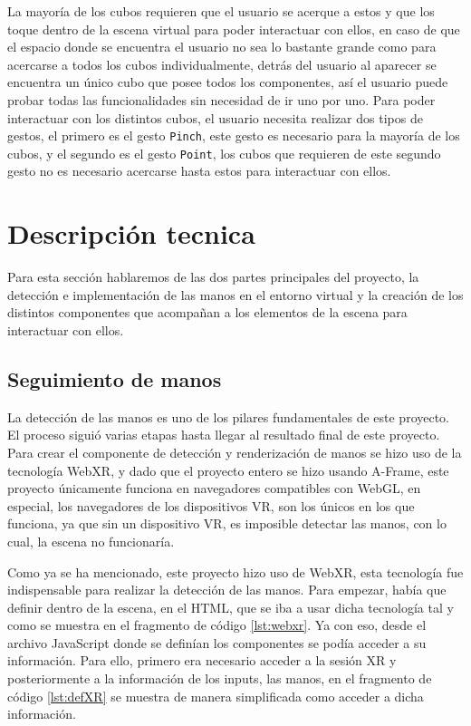 \documentclass[a4paper, 12pt]{book}
\begin{document}
La mayoría de los cubos requieren que el usuario se acerque a estos y que los toque dentro de la escena virtual para poder interactuar con ellos, en caso de que el espacio donde se encuentra el usuario no sea lo bastante grande como para acercarse a todos los cubos individualmente, detrás del usuario al aparecer se encuentra un único cubo que posee todos los componentes, así el usuario puede probar todas las funcionalidades sin necesidad de ir uno por uno. 
Para poder interactuar con los distintos cubos, el usuario necesita realizar dos tipos de gestos, el primero es el gesto \texttt{Pinch}, este gesto es necesario para la mayoría de los cubos, y el segundo es el gesto \texttt{Point}, los cubos que requieren de este segundo gesto no es necesario acercarse hasta estos para interactuar con ellos. 

\section{Descripción tecnica}
\label{sec:descripcion-tecnica}

Para esta sección hablaremos de las dos partes principales del proyecto, la detección e implementación de las manos en el entorno virtual y la creación de los distintos componentes que acompañan a los elementos de la escena para interactuar con ellos.

\subsection{Seguimiento de manos}
\label{subsec:handtracking}
La detección de las manos es uno de los pilares fundamentales de este proyecto. El proceso siguió varias etapas hasta llegar al resultado final de este proyecto. Para crear el componente de detección y renderización de manos se hizo uso de la tecnología WebXR, y dado que el proyecto entero se hizo usando A-Frame, este proyecto únicamente funciona en navegadores compatibles con WebGL, en especial, los navegadores de los dispositivos VR, son los únicos en los que funciona, ya que sin un dispositivo VR, es imposible detectar las manos, con lo cual, la escena no funcionaría.

Como ya se ha mencionado, este proyecto hizo uso de WebXR, esta tecnología fue indispensable para realizar la detección de las manos. Para empezar, había que definir dentro de la escena, en el HTML, que se iba a usar dicha tecnología tal y como se muestra en el fragmento de código \ref{lst:webxr}. Ya con eso, desde el archivo JavaScript donde se definían los componentes se podía acceder a su información. Para ello, primero era necesario acceder a la sesión XR y posteriormente a la información de los inputs, las manos, en el fragmento de código \ref{lst:defXR} se muestra de manera simplificada como acceder a dicha información.
\end{document}
